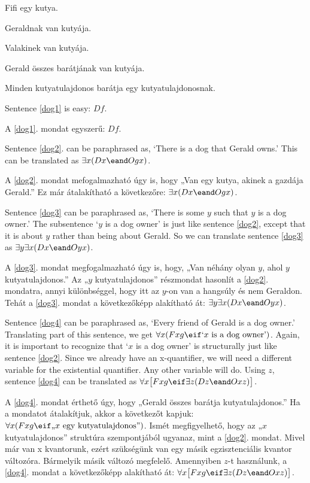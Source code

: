 \begin{earg}
\item[\ex{dog1}] Fifi egy kutya.
\item[\ex{dog2}] Geraldnak van kutyája.
\item[\ex{dog3}] Valakinek van kutyája.
\item[\ex{dog4}] Gerald összes barátjának van kutyája.
\item[\ex{dog5}] Minden kutyatulajdonos barátja egy kutyatulajdonosnak.
\end{earg}

Sentence \ref{dog1} is easy: $Df$.

A \ref{dog1}. mondat egyszerű: $Df$.

Sentence \ref{dog2}. can be paraphrased as, `There is a dog that Gerald owns.' This can be translated as $\exists x(Dx \eand Ogx)$.

A \ref{dog2}. mondat mefogalmazható úgy is, hogy „Van egy kutya, akinek a gazdája Gerald.” Ez már átalakítható a következőre: $\exists x(Dx \eand Ogx)$.

Sentence \ref{dog3} can be paraphrased as, `There is some $y$ such that $y$ is a dog owner.' The subsentence `$y$ is a dog owner' is just like sentence \ref{dog2}, except that it is about $y$ rather than being about Gerald. So we can translate sentence \ref{dog3} as $\exists y \exists x(Dx \eand Oyx)$. 

A \ref{dog3}. mondat megfogalmazható úgy is, hogy, „Van néhány olyan $y$, ahol $y$ kutyatulajdonos.” Az „$y$ kutyatulajdonos” részmondat hasonlít a \ref{dog2}. mondatra, annyi különbséggel, hogy itt az $y$-on van a hangsúly és nem Geraldon. Tehát a \ref{dog3}. mondat a következőképp alakítható át: $\exists y \exists x(Dx \eand Oyx)$. 

Sentence \ref{dog4} can be paraphrased as, `Every friend of Gerald is a dog owner.' Translating part of this sentence, we get $\forall x(Fxg \eif\mbox{`$x$ is a dog owner'})$. Again, it is important to recognize that `$x$ is a dog owner' is structurally just like sentence \ref{dog2}. Since we already have an x-quantifier, we will need a different variable for the existential quantifier. Any other variable will do. Using $z$, sentence \ref{dog4} can be translated as $\forall x\bigl[Fxg \eif\exists z(Dz \eand Oxz)\bigr]$.

A \ref{dog4}. mondat érthető úgy, hogy „Gerald összes barátja kutyatulajdonos.” Ha a mondatot átalakítjuk, akkor a következőt kapjuk: $\forall x(Fxg \eif\mbox{„$x$ egy kutyatulajdonos”})$. Ismét megfigyelhető, hogy az „$x$ kutyatulajdonos” struktúra szempontjából ugyanaz, mint a \ref{dog2}. mondat. Mivel már van x kvantorunk, ezért szükségünk van egy másik egzisztenciális kvantor változóra. Bármelyik másik változó megfelelő. Amennyiben $z$-t használunk, a \ref{dog4}. mondat a következőképp alakítható át: $\forall x\bigl[Fxg \eif\exists z(Dz \eand Oxz)\bigr]$.

